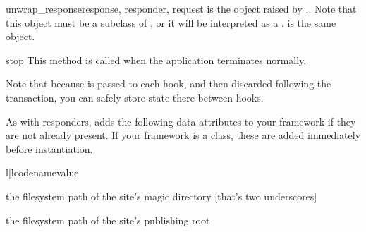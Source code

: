 \begin{funcdesc}{unwrap_response}{response, responder, request} 
is the object raised by .. Note that this
object must be a subclass of , or it will be interpreted
as a .
 is the same  object.

\end{funcdesc}

\begin{funcdesc}{stop}{}
This method is called when the application terminates normally.
\end{funcdesc}

Note that because  is passed to each hook, and then discarded
following the transaction, you can safely store state there between hooks.

As with responders,  adds the following data attributes to your
framework if they are not already present. If your framework is a class, these
are added immediately before instantiation.


\begin{tableii}{l|l}{code}{name}{value}

\lineii{__}
    {the filesystem path of the site's magic directory [that's two underscores]}

    {the filesystem path of the site's publishing root}

\end{tableii}
